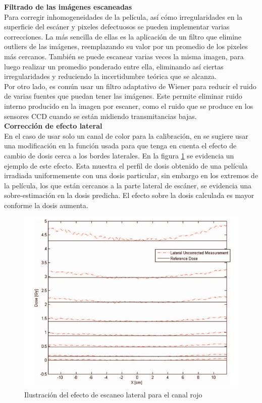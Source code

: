 \textbf{Filtrado de las imágenes escaneadas}\\

Para corregir inhomogeneidades de la película, así cómo irregularidades en la superficie del escáner y pixeles defectuosos se pueden implementar varias correcciones. La más sencilla de ellas es la aplicación de un filtro que elimine outliers de las imágenes, reemplazando su valor por un promedio de los pixeles más cercanos. También se puede escanear varias veces la misma imagen, para luego realizar un promedio ponderado entre ella, eliminando así ciertas irregularidades y reduciendo la incertidumbre teórica que se alcanza.\\

Por otro lado, es común usar un filtro adaptativo de Wiener para reducir el ruido de varias fuentes que puedan tener las imágenes. Este permite eliminar ruido interno producido en la imagen por escaner, como el ruido que se produce en los sensores CCD cuando se están midiendo transmitancias bajas.\\

\textbf{Corrección de efecto lateral} \\

En el caso de usar solo un canal de color para la calibración, en \cite{Crijns2013} se sugiere usar una modificación en la función usada para que tenga en cuenta el efecto de cambio de dosis cerca a los bordes laterales. En la figura \ref{fig:efectoLateral} se evidencia  un ejemplo de este efecto. Esta muestra el perfil de dosis obtenido de una película irradiada uniformemente con una dosis particular, sin embargo en los extremos de la película, los que están cercanos a la parte lateral de escáner, se evidencia una sobre-estimación en la dosis predicha. El efecto sobre la dosis calculada es mayor conforme la dosis aumenta.\\

\begin{figure}[H]
	\centering
	\includegraphics[width=0.9\linewidth]{images/efectoLateral.png}
	\caption{Ilustración del efecto de escaneo lateral para el canal rojo}
	\label{fig:efectoLateral}
\end{figure}

